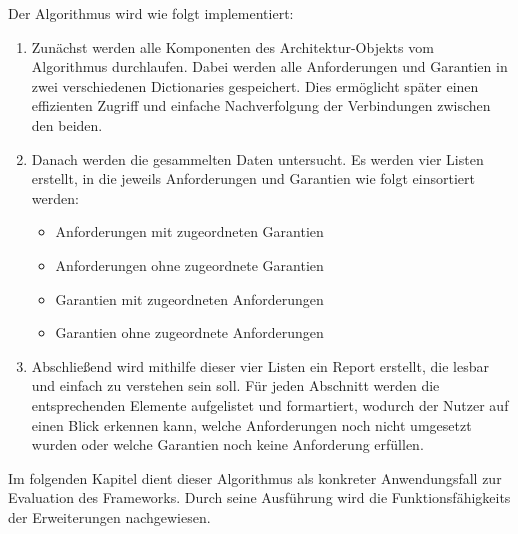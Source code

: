 Der Algorithmus wird wie folgt implementiert:
\begin{enumerate}
  \item Zunächst werden alle Komponenten des Architektur-Objekts vom Algorithmus durchlaufen. Dabei werden alle Anforderungen und Garantien in zwei verschiedenen Dictionaries gespeichert. Dies ermöglicht später einen effizienten Zugriff und einfache Nachverfolgung der Verbindungen zwischen den beiden.
  \item Danach werden die gesammelten Daten untersucht. Es werden vier Listen erstellt, in die jeweils Anforderungen und Garantien wie folgt einsortiert werden:
        \begin{itemize}
          \item Anforderungen mit zugeordneten Garantien
          \item Anforderungen ohne zugeordnete Garantien
          \item Garantien mit zugeordneten Anforderungen
          \item Garantien ohne zugeordnete Anforderungen
        \end{itemize}
  \item Abschließend wird mithilfe dieser vier Listen ein Report erstellt, die lesbar und einfach zu verstehen sein soll. Für jeden Abschnitt werden die entsprechenden Elemente aufgelistet und formartiert, wodurch der Nutzer auf einen Blick erkennen kann, welche Anforderungen noch nicht umgesetzt wurden oder welche Garantien noch keine Anforderung erfüllen.
\end{enumerate}

Im folgenden Kapitel dient dieser Algorithmus als konkreter Anwendungsfall zur Evaluation des Frameworks. Durch seine Ausführung wird die Funktionsfähigkeits der Erweiterungen nachgewiesen.